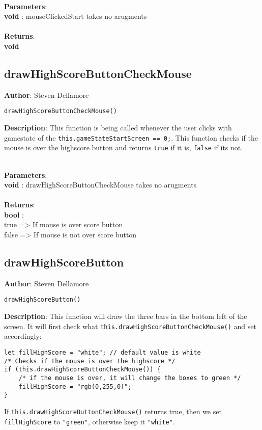 \documentclass[12pt]{article}
\begin{document}
\textbf{\large{\\Parameters}}:\\
\textbf{void }: mouseClickedStart takes no arugments\\\textbf{\large{\\Returns}}:\\
\textbf{void}

\subsection{drawHighScoreButtonCheckMouse}
\textbf{Author}: Steven Dellamore 
\vspace*{1\baselineskip}
\begin{lstlisting}
drawHighScoreButtonCheckMouse()
\end{lstlisting} 
\vspace*{1\baselineskip}
\textbf{Description}: This function is being called whenever the user clicks with gamestate of the \texttt{this.gameStateStartScreen == 0;}. This function checks if the mouse is over the highscore button and returns \texttt{true} if it is, \texttt{false} if its not. 


\textbf{\large{\\Parameters}}:\\
\textbf{void }: drawHighScoreButtonCheckMouse takes no arugments\\\textbf{\large{\\Returns}}:\\
\textbf{bool }: \\true => If mouse is over score button \\false => If mouse is not over score button\\

\subsection{drawHighScoreButton}
\textbf{Author}: Steven Dellamore 
\vspace*{1\baselineskip}
\begin{lstlisting}
drawHighScoreButton()
\end{lstlisting} 
\vspace*{1\baselineskip}
\textbf{Description}: This function will draw the three bars in the bottom left of the screen. It will first check what \texttt{this.drawHighScoreButtonCheckMouse()} and set accordingly: 
\begin{verbatim}
let fillHighScore = "white"; // default value is white
/* Checks if the mouse is over the highscore */
if (this.drawHighScoreButtonCheckMouse()) { 
	/* if the mouse is over, it will change the boxes to green */
	fillHighScore = "rgb(0,255,0)"; 
}
\end{verbatim}
 If \texttt{this.drawHighScoreButtonCheckMouse()} returns true, then we set \texttt{fillHighScore} to \texttt{"green"}, otherwise keep it \texttt{"white"}. 
\end{document}
